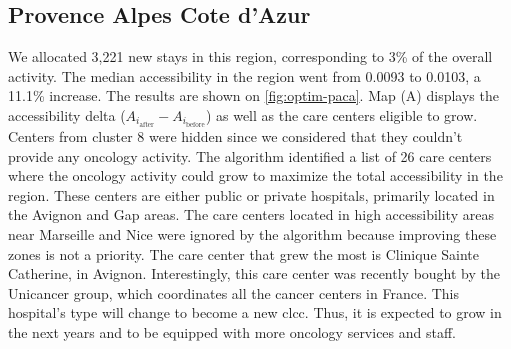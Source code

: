\subsection*{Provence Alpes Cote d'Azur}

We allocated 3,221 new stays in this region, corresponding to 3\% of the overall
activity. The median accessibility in the region went from 0.0093 to 0.0103, a
11.1\% increase. The results are shown on \cref{fig:optim-paca}. Map (A)
displays the accessibility delta ($A_{i_\text{after}} - A_{i_\text{before}}$) as
well as the care centers eligible to grow. Centers from cluster 8 were hidden
since we considered that they couldn't provide any oncology activity. The
algorithm identified a list of 26 care centers where the oncology activity could
grow to maximize the total accessibility in the region. These centers are either
public or private hospitals, primarily located in the Avignon and Gap areas. The
care centers located in high accessibility areas near Marseille and Nice were
ignored by the algorithm because improving these zones is not a priority. The
care center that grew the most is Clinique Sainte Catherine, in Avignon.
Interestingly, this care center was recently bought by the Unicancer group,
which coordinates all the cancer centers in France. This hospital's type will
change to become a new \ac{clcc}. Thus, it is expected to grow in the next years
and to be equipped with more oncology services and staff.

